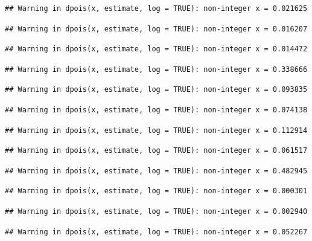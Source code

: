 \documentclass[]{article}
\begin{document}
\begin{verbatim}
## Warning in dpois(x, estimate, log = TRUE): non-integer x = 0.021625
\end{verbatim}

\begin{verbatim}
## Warning in dpois(x, estimate, log = TRUE): non-integer x = 0.016207
\end{verbatim}

\begin{verbatim}
## Warning in dpois(x, estimate, log = TRUE): non-integer x = 0.014472
\end{verbatim}

\begin{verbatim}
## Warning in dpois(x, estimate, log = TRUE): non-integer x = 0.338666
\end{verbatim}

\begin{verbatim}
## Warning in dpois(x, estimate, log = TRUE): non-integer x = 0.093835
\end{verbatim}

\begin{verbatim}
## Warning in dpois(x, estimate, log = TRUE): non-integer x = 0.074138
\end{verbatim}

\begin{verbatim}
## Warning in dpois(x, estimate, log = TRUE): non-integer x = 0.112914
\end{verbatim}

\begin{verbatim}
## Warning in dpois(x, estimate, log = TRUE): non-integer x = 0.061517
\end{verbatim}

\begin{verbatim}
## Warning in dpois(x, estimate, log = TRUE): non-integer x = 0.482945
\end{verbatim}

\begin{verbatim}
## Warning in dpois(x, estimate, log = TRUE): non-integer x = 0.000301
\end{verbatim}

\begin{verbatim}
## Warning in dpois(x, estimate, log = TRUE): non-integer x = 0.002940
\end{verbatim}

\begin{verbatim}
## Warning in dpois(x, estimate, log = TRUE): non-integer x = 0.052267
\end{verbatim}
\end{document}
